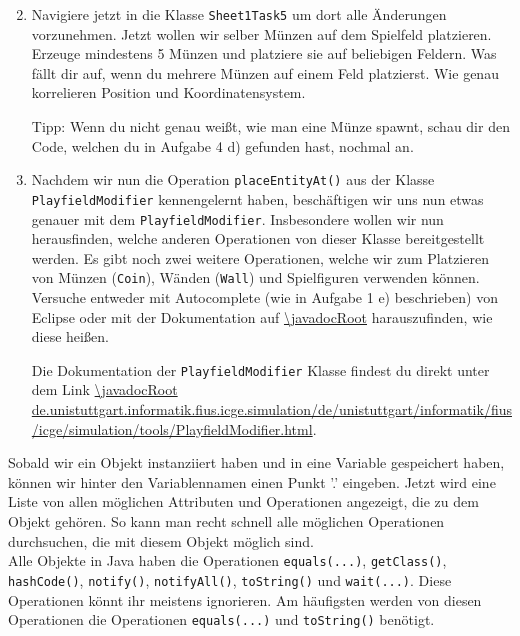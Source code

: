 \begin{enumerate} \setcounter{enumi}{1}
    \item Navigiere jetzt in die Klasse \lstinline{Sheet1Task5} um dort alle Änderungen vorzunehmen. 
        Jetzt wollen wir selber Münzen auf dem Spielfeld platzieren. 
        Erzeuge mindestens 5 Münzen und platziere sie auf beliebigen Feldern. 
        Was fällt dir auf, wenn du mehrere Münzen auf einem Feld platzierst. 
        Wie genau korrelieren Position und Koordinatensystem.

        Tipp: Wenn du nicht genau weißt, wie man eine Münze spawnt, schau dir den Code, welchen du in Aufgabe 4 d) gefunden hast, nochmal an.

    \item Nachdem wir nun die Operation \lstinline{placeEntityAt()} aus der Klasse \lstinline{PlayfieldModifier} kennengelernt haben, beschäftigen wir uns nun etwas genauer mit dem \lstinline{PlayfieldModifier}. 
        Insbesondere wollen wir nun herausfinden, welche anderen Operationen von dieser Klasse bereitgestellt werden. 
        Es gibt noch zwei weitere Operationen, welche wir zum Platzieren von Münzen (\lstinline{Coin}), Wänden (\lstinline{Wall}) und Spielfiguren verwenden können. 
        Versuche entweder mit Autocomplete (wie in Aufgabe 1 e) beschrieben) von Eclipse oder mit der Dokumentation auf \url{\javadocRoot} harauszufinden, wie diese heißen.

        Die Dokumentation der \lstinline{PlayfieldModifier} Klasse findest du direkt unter dem Link \url{\javadocRoot de.unistuttgart.informatik.fius.icge.simulation/de/unistuttgart/informatik/fius/icge/simulation/tools/PlayfieldModifier.html}.
        
\end{enumerate}

\begin{Infobox}[Autocompletion]
    Sobald wir ein Objekt instanziiert haben und in eine Variable gespeichert haben, können wir hinter den Variablennamen einen Punkt '.' eingeben. 
    Jetzt wird eine Liste von allen möglichen Attributen und Operationen angezeigt, die zu dem Objekt gehören. 
    So kann man recht schnell alle möglichen Operationen durchsuchen, die mit diesem Objekt möglich sind.\\

    Alle Objekte in Java haben die Operationen \lstinline{equals(...)}, \lstinline{getClass()}, \lstinline{hashCode()}, \lstinline{notify()}, \lstinline{notifyAll()}, \lstinline{toString()} und \lstinline{wait(...)}.
    Diese Operationen könnt ihr meistens ignorieren.
    Am häufigsten werden von diesen Operationen die Operationen \lstinline{equals(...)} und \lstinline{toString()} benötigt.
\end{Infobox}

